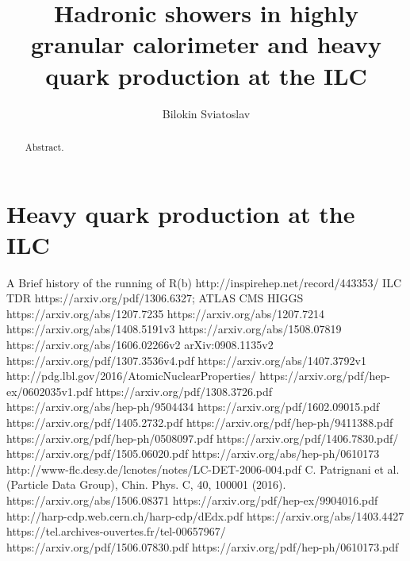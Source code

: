 \documentclass[a4paper]{article}
\title{Hadronic showers in highly granular calorimeter and heavy quark production at the ILC}
\author{Bilokin Sviatoslav}
\begin{document}
\maketitle
\begin{abstract}
Abstract.
\end{abstract}
\tableofcontents
\linenumbers
%
%

\newpage
%
\newpage
\part{Heavy quark production at the ILC}


% 
\begin{thebibliography}{100} 
 A Brief history of the running of R(b) http://inspirehep.net/record/443353/
 ILC TDR https://arxiv.org/pdf/1306.6327;
 ATLAS CMS HIGGS 
https://arxiv.org/abs/1207.7235
 https://arxiv.org/abs/1207.7214
  https://arxiv.org/abs/1408.5191v3
 https://arxiv.org/abs/1508.07819
 https://arxiv.org/abs/1606.02266v2
  arXiv:0908.1135v2
 https://arxiv.org/pdf/1307.3536v4.pdf
 https://arxiv.org/abs/1407.3792v1
 http://pdg.lbl.gov/2016/AtomicNuclearProperties/
 https://arxiv.org/pdf/hep-ex/0602035v1.pdf
https://arxiv.org/pdf/1308.3726.pdf
 https://arxiv.org/abs/hep-ph/9504434
 https://arxiv.org/pdf/1602.09015.pdf
 https://arxiv.org/pdf/1405.2732.pdf
 https://arxiv.org/pdf/hep-ph/9411388.pdf
https://arxiv.org/pdf/hep-ph/0508097.pdf
 https://arxiv.org/pdf/1406.7830.pdf/
https://arxiv.org/pdf/1505.06020.pdf
https://arxiv.org/abs/hep-ph/0610173
http://www-flc.desy.de/lcnotes/notes/LC-DET-2006-004.pdf
C. Patrignani et al. (Particle Data Group), Chin. Phys. C, 40, 100001 (2016).
 https://arxiv.org/abs/1506.08371
 https://arxiv.org/pdf/hep-ex/9904016.pdf
 http://harp-cdp.web.cern.ch/harp-cdp/dEdx.pdf
 https://arxiv.org/abs/1403.4427
 https://tel.archives-ouvertes.fr/tel-00657967/
https://arxiv.org/pdf/1506.07830.pdf
https://arxiv.org/pdf/hep-ph/0610173.pdf
\end{thebibliography}
\end{document}

